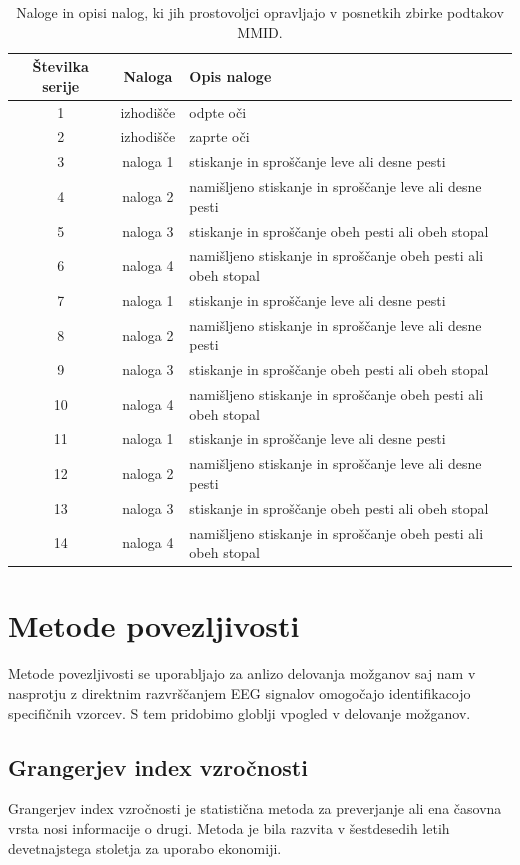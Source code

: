 \begin{table}[h]
\centering
\begin{tabular}{|c|c|l|}

\hline
Številka serije & Naloga &Opis naloge \\
\hline
1 & izhodišče & odpte oči  \\
\hline
2 & izhodišče & zaprte oči  \\
\hline
3 & naloga 1 & stiskanje in sproščanje leve ali desne pesti \\
\hline
4 & naloga 2 &namišljeno stiskanje in sproščanje leve ali desne pesti  \\
\hline
5 & naloga 3 &stiskanje in sproščanje obeh pesti ali obeh stopal \\
\hline
6 & naloga 4 &namišljeno stiskanje in sproščanje obeh pesti ali obeh stopal  \\
\hline
7 & naloga 1 &stiskanje in sproščanje leve ali desne pesti \\
\hline
8 & naloga 2 &namišljeno stiskanje in sproščanje leve ali desne pesti  \\
\hline
9 & naloga 3 &stiskanje in sproščanje obeh pesti ali obeh stopal \\
\hline
10 & naloga 4 &namišljeno stiskanje in sproščanje obeh pesti ali obeh stopal  \\
\hline
11 & naloga 1 &stiskanje in sproščanje leve ali desne pesti \\
\hline
12 &naloga 2 &namišljeno stiskanje in sproščanje leve ali desne pesti  \\
\hline
13 & naloga 3 &stiskanje in sproščanje obeh pesti ali obeh stopal \\
\hline
14 & naloga 4 &namišljeno stiskanje in sproščanje obeh pesti ali obeh stopal  \\

\hline
\end{tabular}
\caption{Naloge in opisi nalog, ki jih prostovoljci opravljajo v posnetkih zbirke podtakov MMID.}
\end{table}


\section{Metode povezljivosti}
Metode povezljivosti se uporabljajo za anlizo delovanja možganov saj nam v nasprotju z direktnim razvrščanjem EEG signalov omogočajo identifikacojo specifičnih vzorcev. S tem pridobimo globlji vpogled v delovanje možganov.

\subsection{Grangerjev index vzročnosti}
Grangerjev index vzročnosti je statistična metoda za preverjanje ali ena časovna vrsta nosi informacije o drugi. Metoda je bila razvita v šestdesedih letih devetnajstega stoletja za uporabo ekonomiji.\cite{cohenAnalyzingNeuralTime2014}

